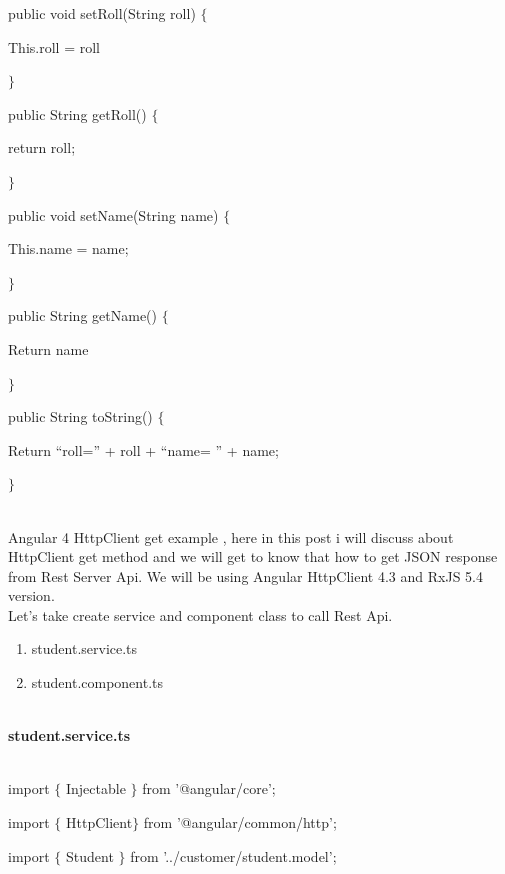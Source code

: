 \documentclass{article}
\begin{document}
\noindent public void setRoll(String roll) $\mathrm{\{}$ 

\noindent This.roll = roll

\noindent $\mathrm{\}}$

\noindent public String getRoll() $\mathrm{\{}$

\noindent return roll;

\noindent $\mathrm{\}}$

 

\noindent public void setName(String name) $\mathrm{\{}$

\noindent This.name = name;

\noindent $\mathrm{\}}$

 

\noindent public String getName() $\mathrm{\{}$

\noindent Return name

\noindent $\mathrm{\}}$

\noindent public String toString() $\mathrm{\{}$

\noindent Return ``roll='' + roll + ``name= '' + name;

\noindent $\mathrm{\}}$

 

\noindent \\ Angular 4 HttpClient get example , here in this post i will discuss about HttpClient get method and we will get to know that how to get JSON response from Rest Server Api. We will be using Angular HttpClient 4.3 and RxJS 5.4 version.
\newpage
\noindent \\ Let's take create service and component class to call Rest Api.

\begin{enumerate}
	\item student.service.ts   
	\item student.component.ts   
\end{enumerate}

\noindent \\ \textbf{student.service.ts}

 

\noindent \\ import $\mathrm{\{}$ Injectable $\mathrm{\}}$ from '@angular/core';

\noindent import $\mathrm{\{}$ HttpClient$\mathrm{\}}$ from '@angular/common/http';

\noindent import $\mathrm{\{}$ Student $\mathrm{\}}$ from '../customer/student.model';
\end{document}
